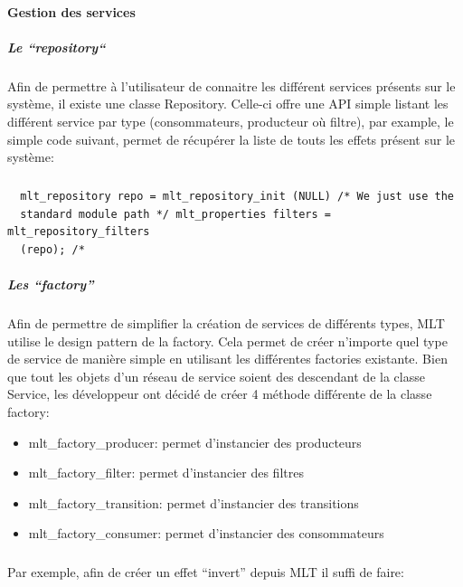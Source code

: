 \paragraph{Gestion des services}

\subparagraph{Le ``repository``}

Afin de permettre à l'utilisateur de connaitre les différent services
présents sur le système, il existe une classe Repository. Celle-ci
offre une API simple listant les différent service par type
(consommateurs, producteur où filtre),  par example, le simple code
suivant, permet de récupérer la liste de touts les effets présent
sur le système:

\subparagraph{}

\begin{lstlisting}
  mlt_repository repo = mlt_repository_init (NULL) /* We just use the
  standard module path */ mlt_properties filters = mlt_repository_filters
  (repo); /*
\end{lstlisting}

\subparagraph{Les ``factory''}

Afin de permettre de simplifier la création de services de différents
types, MLT utilise le design pattern de la factory. Cela permet de
créer n'importe quel type de service de manière simple en utilisant les
différentes factories existante. Bien que tout les objets d'un réseau
de service soient des descendant de la classe Service, les développeur
ont décidé de créer 4 méthode différente de la classe factory:

\begin{itemize}

  \item {mlt\_factory\_producer: permet d'instancier des producteurs}

  \item {mlt\_factory\_filter: permet d'instancier des filtres}

  \item {mlt\_factory\_transition: permet d'instancier des transitions}

  \item {mlt\_factory\_consumer: permet d'instancier des consommateurs}

\end{itemize}

\subparagraph{}

Par exemple, afin de créer un effet ``invert'' depuis MLT il suffi
de faire:

\subparagraph{}

